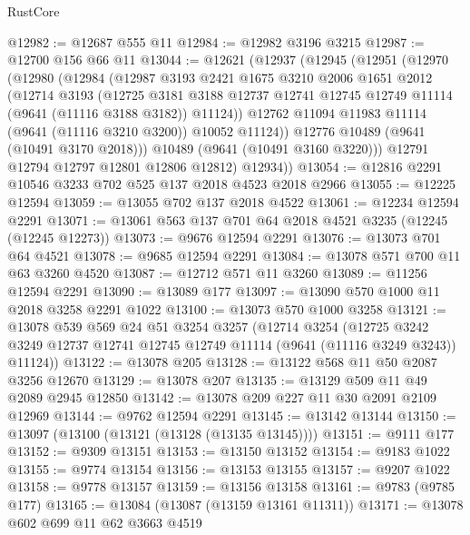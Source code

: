 \begin{lexlean}{RustCore}
\begin{coremodule}
@12982 := @12687 @555 @11
@12984 := @12982 @3196 @3215
@12987 := @12700 @156 @66 @11
@13044 := @12621
    (@12937
      (@12945
        (@12951
          (@12970
            (@12980
              (@12984
                (@12987
                  @3193
                  @2421
                  @1675
                  @3210
                  @2006
                  @1651
                  @2012
                  (@12714
                    @3193
                    (@12725
                      @3181
                      @3188
                      @12737
                      @12741
                      @12745
                      @12749
                      @11114
                      (@9641 (@11116 @3188 @3182))
                      @11124))
                  @12762
                  @11094
                  @11983
                  @11114
                  (@9641 (@11116 @3210 @3200))
                  @10052
                  @11124))
              @12776
              @10489
              (@9641 (@10491 @3170 @2018)))
            @10489
            (@9641 (@10491 @3160 @3220)))
          @12791
          @12794
          @12797
          @12801
          @12806
          @12812)
        @12934))
@13054 := @12816 @2291 @10546 @3233 @702 @525 @137 @2018 @4523 @2018 @2966
@13055 := @12225 @12594
@13059 := @13055 @702 @137 @2018 @4522
@13061 := @12234 @12594 @2291
@13071 := @13061 @563 @137 @701 @64 @2018 @4521 @3235 (@12245 (@12245 @12273))
@13073 := @9676 @12594 @2291
@13076 := @13073 @701 @64 @4521
@13078 := @9685 @12594 @2291
@13084 := @13078 @571 @700 @11 @63 @3260 @4520
@13087 := @12712 @571 @11 @3260
@13089 := @11256 @12594 @2291
@13090 := @13089 @177
@13097 := @13090 @570 @1000 @11 @2018 @3258 @2291 @1022
@13100 := @13073 @570 @1000 @3258
@13121 := @13078
    @539
    @569
    @24
    @51
    @3254
    @3257
    (@12714
      @3254
      (@12725 @3242 @3249 @12737 @12741 @12745 @12749 @11114 (@9641 (@11116 @3249 @3243)) @11124))
@13122 := @13078 @205
@13128 := @13122 @568 @11 @50 @2087 @3256 @12670
@13129 := @13078 @207
@13135 := @13129 @509 @11 @49 @2089 @2945 @12850
@13142 := @13078 @209 @227 @11 @30 @2091 @2109 @12969
@13144 := @9762 @12594 @2291
@13145 := @13142 @13144
@13150 := @13097 (@13100 (@13121 (@13128 (@13135 @13145))))
@13151 := @9111 @177
@13152 := @9309 @13151
@13153 := @13150 @13152
@13154 := @9183 @1022
@13155 := @9774 @13154
@13156 := @13153 @13155
@13157 := @9207 @1022
@13158 := @9778 @13157
@13159 := @13156 @13158
@13161 := @9783 (@9785 @177)
@13165 := @13084 (@13087 (@13159 @13161 @11311))
@13171 := @13078 @602 @699 @11 @62 @3663 @4519

\end{coremodule}
\end{lexlean}
